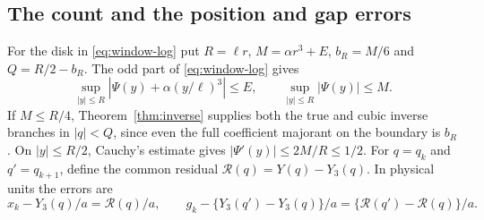 \subsection{The count and the position and gap errors}

For the disk in \eqref{eq:window-log} put
\(R=\ell r\), \(M=\alpha r^3+E\), \(b_R=M/6\) and \(Q=R/2-b_R\).
The odd part of \eqref{eq:window-log} gives
\[
 \sup_{|y|\le R}|\Psi(y)+\alpha(y/\ell)^3|\le E,\qquad
 \sup_{|y|\le R}|\Psi(y)|\le M .
\]
If \(M\le R/4\), Theorem~\ref{thm:inverse} supplies both the true and
cubic inverse branches in \(|q|<Q\), since even the full coefficient
majorant on the boundary is \(b_R\). On \(|y|\le R/2\),
Cauchy's estimate gives \(|\Psi'(y)|\le2M/R\le1/2\).
For \(q=q_k\) and \(q'=q_{k+1}\), define the common residual
\(\mathcal R(q)=Y(q)-Y_3(q)\). In physical units the errors are
\begin{equation}
 x_k-Y_3(q)/a=\mathcal R(q)/a,\qquad
 g_k-\{Y_3(q')-Y_3(q)\}/a
      =\{\mathcal R(q')-\mathcal R(q)\}/a .
 \label{eq:shared-residual}
\end{equation}

